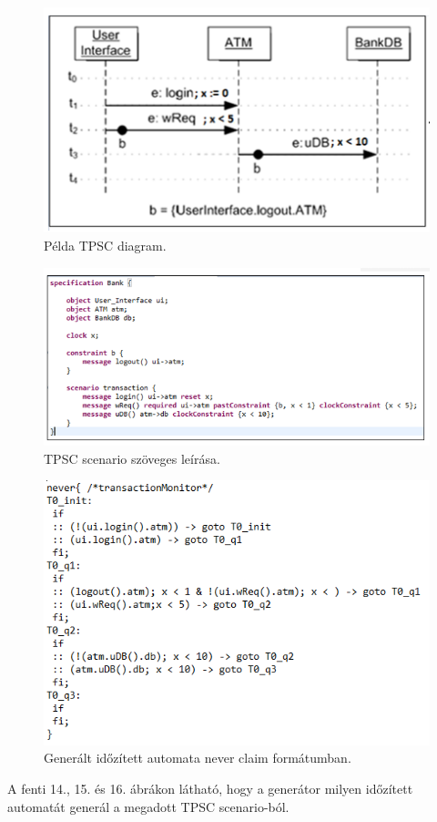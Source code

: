 \begin{figure}[!ht]
    \centering
    \includegraphics[width=150mm, keepaspectratio]{figures/14abra.png}
    \caption{Példa TPSC diagram.}
\end{figure}

\begin{figure}[!ht]
    \centering
    \includegraphics[width=150mm, keepaspectratio]{figures/15abra.png}
    \caption{TPSC scenario szöveges leírása.}
\end{figure}

\begin{figure}[!ht]
    \centering
    \includegraphics[width=150mm, keepaspectratio]{figures/16abra.png}
    \caption{Generált időzített automata never claim formátumban.}
\end{figure}

A fenti 14., 15. és 16. ábrákon látható, hogy a generátor milyen időzített automatát generál a megadott TPSC scenario-ból.